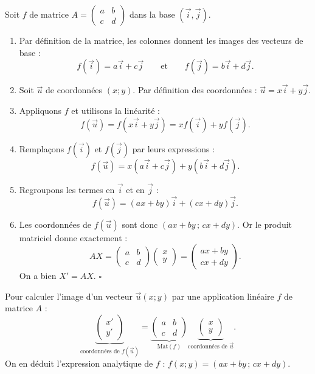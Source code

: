\documentclass[11pt]{article}
\begin{document}
\begin{experience}[Démonstration guidée : pourquoi $X' = AX$]
Soit $f$ de matrice $A = \begin{pmatrix} a & b \\ c & d \end{pmatrix}$ dans la base $(\vec{i}, \vec{j})$.
\begin{enumerate}
\item Par définition de la matrice, les colonnes donnent les images des vecteurs de base :
\[ f(\vec{i}) = a\vec{i} + c\vec{j} \qquad \text{et} \qquad f(\vec{j}) = b\vec{i} + d\vec{j}. \]
\item Soit $\vec{u}$ de coordonnées $(x ; y)$. Par définition des coordonnées : $\vec{u} = x\vec{i} + y\vec{j}$.
\item Appliquons $f$ et utilisons la linéarité :
\[ f(\vec{u}) = f(x\vec{i} + y\vec{j}) = x f(\vec{i}) + y f(\vec{j}). \]
\item Remplaçons $f(\vec{i})$ et $f(\vec{j})$ par leurs expressions :
\[ f(\vec{u}) = x(a\vec{i} + c\vec{j}) + y(b\vec{i} + d\vec{j}). \]
\item Regroupons les termes en $\vec{i}$ et en $\vec{j}$ :
\[ f(\vec{u}) = (ax + by)\vec{i} + (cx + dy)\vec{j}. \]
\item Les coordonnées de $f(\vec{u})$ sont donc $(ax + by \,;\, cx + dy)$. Or le produit matriciel donne exactement :
\[ AX = \begin{pmatrix} a & b \\ c & d \end{pmatrix}\begin{pmatrix} x \\ y \end{pmatrix} = \begin{pmatrix} ax + by \\ cx + dy \end{pmatrix}. \]
On a bien $X' = AX$. \hfill $\square$
\end{enumerate}
\end{experience}

\begin{aretenir}
Pour calculer l'image d'un vecteur $\vec{u}(x ; y)$ par une application linéaire $f$ de matrice $A$ :
\[ \underbrace{\begin{pmatrix} x' \\ y' \end{pmatrix}}_{\text{coordonnées de } f(\vec{u})} = \underbrace{\begin{pmatrix} a & b \\ c & d \end{pmatrix}}_{\mathrm{Mat}(f)} \underbrace{\begin{pmatrix} x \\ y \end{pmatrix}}_{\text{coordonnées de } \vec{u}}. \]
On en déduit l'expression analytique de $f$ : $f(x ; y) = (ax + by \,;\, cx + dy)$.
\end{aretenir}
\end{document}
